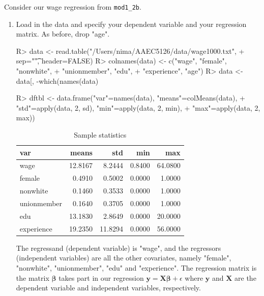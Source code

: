 \documentclass[11pt,reqno]{article}   %
\newcommand{\mlt}[1]{\mathbf{#1}} %
\newcommand{\mgr}[1]{\boldsymbol{#1}}%
\newcommand{\kbeta}{\mgr{\beta}}
\newcommand{\keps}{\epsilon}
\newcommand{\kX}{\mlt{X}}
\newcommand{\ky}{\mlt{y}}
\begin{document}
Consider our wage regression from \texttt{mod1\_2b}.
\begin{enumerate}
\item
Load in the data and specify your dependent variable and your regression matrix.
As before, drop "age".
\begin{Schunk}
\begin{Sinput}
R> data <- read.table("/Users/nima/AAEC5126/data/wage1000.txt", 
+                    sep="\t", header=FALSE)
R> colnames(data) <- c("wage", "female", "nonwhite", 
+                     "unionmember", "edu", 
+                     "experience", "age")
R> data <- data[, -which(names(data) %
\end{Sinput}
\end{Schunk}

\begin{Schunk}
\begin{Sinput}
R> dftbl <- data.frame("var"=names(data), "means"=colMeans(data),
+                     "std"=apply(data, 2, sd), "min"=apply(data, 2, min),
+                     "max"=apply(data, 2, max))
\end{Sinput}
\end{Schunk}

\begin{table}[!h]
\centering
\caption{Sample statistics} 
\begin{tabular}{lrrrr}
  \hline
var & means & std & min & max \\ 
  \hline
wage & 12.8167 & 8.2444 & 0.8400 & 64.0800 \\ 
  female & 0.4910 & 0.5002 & 0.0000 & 1.0000 \\ 
  nonwhite & 0.1460 & 0.3533 & 0.0000 & 1.0000 \\ 
  unionmember & 0.1640 & 0.3705 & 0.0000 & 1.0000 \\ 
  edu & 13.1830 & 2.8649 & 0.0000 & 20.0000 \\ 
  experience & 19.2350 & 11.8294 & 0.0000 & 56.0000 \\ 
   \hline
\end{tabular}
\end{table}
The regressand (dependent variable) is "wage", and the regressors (independent variables) are all the other covariates, namely "female", "nonwhite", "unionmember", "edu" and "experience". The regression matrix is the matrix $\kbeta$ takes part in our regression $\ky=\kX\kbeta+\keps$ where $\ky$ and $\kX$ are the dependent variable and independent variables, respectively. 


\end{enumerate}
\end{document}
